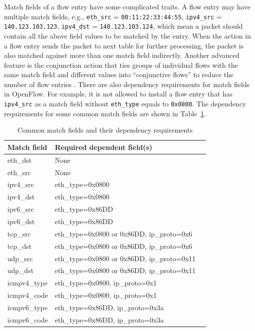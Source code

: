 \documentclass[conference]{IEEEtran}
\begin{document}
Match fields of a flow entry have some complicated traits. A flow entry may have multiple match fields, e.g., \texttt{eth\_src} = \texttt{00:11:22:33:44:55}, \texttt{ipv4\_src} = \texttt{140.123.103.123}, \texttt{ipv4\_dst} = \texttt{140.123.103.124}, which mean a packet should contain all the above field values to be matched by the entry. When the action in a flow entry sends the packet to next table for further processing, the packet is also matched against more than one match field indirectly. Another advanced feature is the conjunction action that ties groups of individual flows with the same match field and different values into ``conjunctive flows'' to reduce the number of flow entries \cite{OVS_OFCTL}. There are also dependency requirements for match fields in OpenFlow. For example, it is not allowed to install a flow entry that has \texttt{ipv4\_src} as a match field without \texttt{eth\_type} equals to \texttt{0x0800}. The dependency requirements for some common match fields are shown in Table~\ref{table:match_fields_dependency}.

\begin{table}[ht]
\centering
\caption{Common match fields and their dependency requirements}
\begin{tabular}{|l|l|l}
\hline Match field & Required dependent field(s) \\
\hline
\hline eth\_dst & None \\
\hline eth\_src & None \\
\hline ipv4\_src & eth\_type=0x0800 \\
\hline ipv4\_dst & eth\_type=0x0800 \\
\hline ipv6\_src & eth\_type=0x86DD \\
\hline ipv6\_dst & eth\_type=0x86DD \\
\hline tcp\_src & eth\_type=0x0800 or 0x86DD, ip\_proto=0x6 \\
\hline tcp\_dst & eth\_type=0x0800 or 0x86DD, ip\_proto=0x6 \\
\hline udp\_src & eth\_type=0x0800 or 0x86DD, ip\_proto=0x11 \\
\hline udp\_dst & eth\_type=0x0800 or 0x86DD, ip\_proto=0x11 \\
\hline icmpv4\_type & eth\_type=0x0800, ip\_proto=0x1 \\
\hline icmpv4\_code & eth\_type=0x0800, ip\_proto=0x1 \\
\hline icmpv6\_type & eth\_type=0x86DD, ip\_proto=0x3a \\
\hline icmpv6\_code & eth\_type=0x86DD, ip\_proto=0x3a \\
\hline
\end{tabular}
\label{table:match_fields_dependency}
\end{table}
\end{document}
